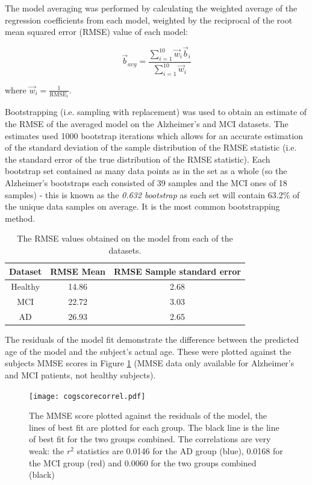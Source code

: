 The model averaging was performed by calculating the weighted average of the regression coefficients from each model, weighted by the reciprocal of the root mean squared error (RMSE) value of each model:

\begin{equation} \vec{b}_{avg} = \frac{\sum\limits_{i=1}^{10} \vec{w}_i \vec{b}_i }{ \sum\limits_{i=1}^{10} \vec{w}_i}\end{equation}

where $\vec{w}_i = \frac{1}{\textrm{RMSE}_i}$.

Bootstrapping (i.e. sampling with replacement) \cite{Witten2011} was used to obtain an estimate of the RMSE of the averaged model on the Alzheimer's and MCI datasets. The estimates used 1000 bootstrap iterations which allows for an accurate estimation of the standard deviation of the sample distribution of the RMSE statistic (i.e. the standard error of the true distribution of the RMSE statistic). Each bootstrap set contained as many data points as in the set as a whole (so the Alzheimer's bootstraps each consisted of 39 samples and the MCI ones of 18 samples) - this is known as the \textit{0.632 bootstrap} as each set will contain 63.2\% of the unique data samples on average. It is the most common bootstrapping method. \cite{Witten2011}
\begin{table}[h!]
\begin{center}
\begin{tabular}[h!]{|c|c|c|}
\hline
Dataset & RMSE Mean & RMSE Sample standard error \\
\hline
Healthy & 14.86 & 2.68 \\
\hline
MCI & 22.72 & 3.03 \\
\hline
AD & 26.93 & 2.65\\
\hline
\end{tabular}
\caption{The RMSE values obtained on the model from each of the datasets.}
\label{tab:rmsevals}
\end{center}
\end{table}

The residuals of the model fit demonstrate the difference between the predicted age of the model and the subject's actual age. These were plotted against the subjects MMSE scores in Figure \ref{fig:cogscorecorrel} (MMSE data only available for Alzheimer's and MCI patients, not healthy subjects).

\begin{figure}[h!]
  \centering
    \texttt{[image: cogscorecorrel.pdf]}
    \caption{The MMSE score plotted against the residuals of the model, the lines of best fit are plotted for each group. The black line is the line of best fit for the two groups combined. The correlations are very weak: the $r^2$ statistics are 0.0146 for the AD group (blue), 0.0168 for the MCI group (red) and 0.0060 for the two groups combined (black)}
    \label{fig:cogscorecorrel}
\end{figure}





